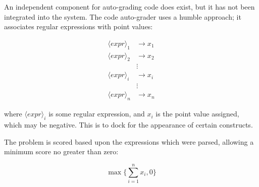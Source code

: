 An independent component for auto-grading code does exist, but it has not been
integrated into the system.  The code auto-grader uses a humble approach; it
associates regular expressions with point values:

 \begin{align*}
  \langle expr \rangle_1 & \rightarrow  x_1 \\
  \langle expr \rangle_2 & \rightarrow  x_2 \\
                         & \vdots       \\
  \langle expr \rangle_i & \rightarrow  x_i \\
                         & \vdots       \\
  \langle expr \rangle_n & \rightarrow  x_n 
 \end{align*}

where $\langle expr \rangle_i$ is some regular expression, and $x_i$ is the
point value assigned, which may be negative.  This is to dock for the
appearance of certain constructs.

The problem is scored based upon the expressions which were parsed, allowing
a minimum score no greater than zero:

\begin{equation}
  \max \Bigg\{ \displaystyle\sum_{i=1}^n x_i, 0 \Bigg\}
\end{equation}


